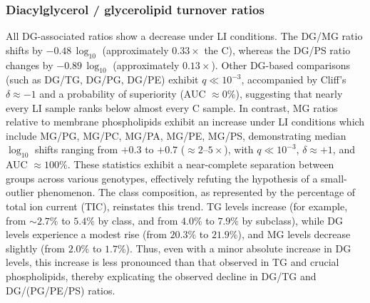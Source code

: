 \documentclass[10pt,letterpaper]{article}
\begin{document}
\begin{itemize}
\subsubsection*{Diacylglycerol / glycerolipid turnover ratios}
All DG-associated ratios show a decrease under LI conditions. The DG/MG ratio shifts by $-0.48 \,\log_{10}$ (approximately $0.33\times$ the C), whereas the DG/PS ratio changes by $-0.89 \,\log_{10}$ (approximately $0.13\times$). Other DG-based comparisons (such as DG/TG, DG/PG, DG/PE) exhibit $q \ll 10^{-3}$, accompanied by Cliff’s $\delta \approx -1$ and a probability of superiority (AUC $\approx 0\%$), suggesting that nearly every LI sample ranks below almost every C sample. In contrast, MG ratios relative to membrane phospholipids exhibit an increase under LI conditions which include MG/PG, MG/PC, MG/PA, MG/PE, MG/PS, demonstrating median $\log_{10}$ shifts ranging from $+0.3$ to $+0.7$ ($\approx 2$–$5\times$), with $q \ll 10^{-3}$, $\delta \approx +1$, and AUC $\approx 100\%$. These statistics exhibit a near-complete separation between groups across various genotypes, effectively refuting the hypothesis of a small-outlier phenomenon. The class composition, as represented by the percentage of total ion current (TIC), reinstates this trend. TG levels increase (for example, from $\sim 2.7\%$ to $5.4\%$ by class, and from $4.0\%$ to $7.9\%$ by subclass), while DG levels experience a modest rise (from $20.3\%$ to $ 21.9\%$), and MG levels decrease slightly (from $2.0\% $ to $1.7\%$). Thus, even with a minor absolute increase in DG levels, this increase is less pronounced than that observed in TG and crucial phospholipids, thereby explicating the observed decline in DG/TG and DG/(PG/PE/PS) ratios. 





\end{itemize}
\end{document}
